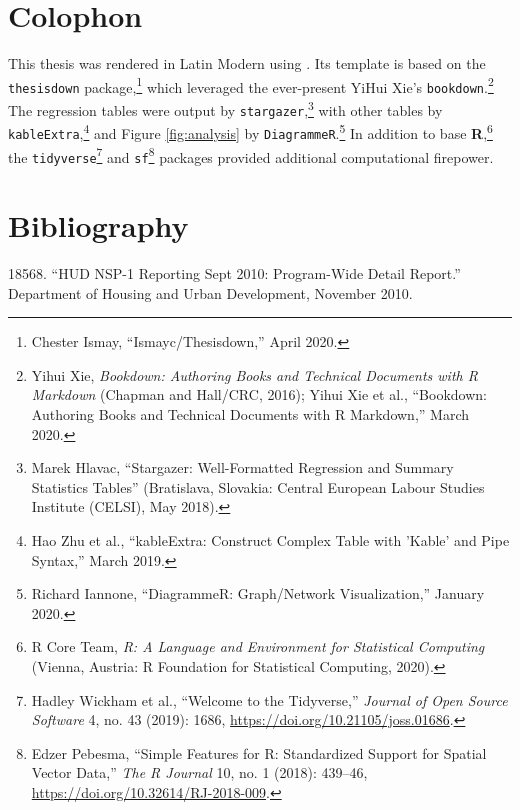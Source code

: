 \documentclass[12pt,oneside]{psthesis}
\begin{document}
\hypertarget{colophon}{%
\chapter*{Colophon}\label{colophon}}

This thesis was rendered in Latin Modern using \LaTeXe.
Its template is based on the \texttt{thesisdown} package,\footnote{Chester Ismay, ``Ismayc/Thesisdown,'' April 2020.} which leveraged the ever-present YiHui Xie's \texttt{bookdown}.\footnote{Yihui Xie, \emph{Bookdown: Authoring Books and Technical Documents with R Markdown} (Chapman and Hall/CRC, 2016); Yihui Xie et al., ``Bookdown: Authoring Books and Technical Documents with R Markdown,'' March 2020.}
The regression tables were output by \texttt{stargazer},\footnote{Marek Hlavac, ``Stargazer: Well-Formatted Regression and Summary Statistics Tables'' (Bratislava, Slovakia: Central European Labour Studies Institute (CELSI), May 2018).} with other tables by \texttt{kableExtra},\footnote{Hao Zhu et al., ``kableExtra: Construct Complex Table with 'Kable' and Pipe Syntax,'' March 2019.} and Figure \ref{fig:analysis} by \texttt{DiagrammeR}.\footnote{Richard Iannone, ``DiagrammeR: Graph/Network Visualization,'' January 2020.}
In addition to base \textbf{R},\footnote{R Core Team, \emph{R: A Language and Environment for Statistical Computing} (Vienna, Austria: R Foundation for Statistical Computing, 2020).} the \texttt{tidyverse}\footnote{Hadley Wickham et al., ``Welcome to the Tidyverse,'' \emph{Journal of Open Source Software} 4, no. 43 (2019): 1686, \url{https://doi.org/10.21105/joss.01686}.} and \texttt{sf}\footnote{Edzer Pebesma, ``Simple Features for R: Standardized Support for Spatial Vector Data,'' \emph{The R Journal} 10, no. 1 (2018): 439--46, \url{https://doi.org/10.32614/RJ-2018-009}.} packages provided additional computational firepower.

\backmatter

\hypertarget{bibliography}{%
\chapter{Bibliography}\label{bibliography}}

\setlength{\parindent}{-0.25in}
\setlength{\leftskip}{0.25in}

\noindent

\hypertarget{refs}{}
\leavevmode\hypertarget{ref-185682010huda}{}%
18568. ``HUD NSP-1 Reporting Sept 2010: Program-Wide Detail Report.'' Department of Housing and Urban Development, November 2010.
\end{document}
